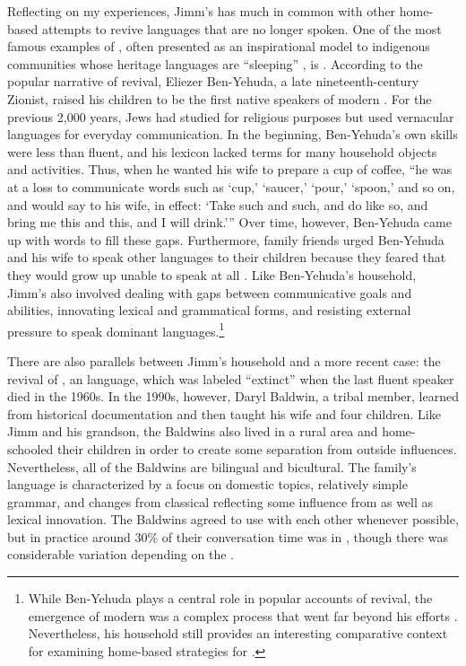 \documentclass[output=paper]{LSP/langsci}
\begin{document}
Reflecting on my experiences, Jimm's  has much in common with other home-based attempts to revive languages that are no longer spoken. One of the most famous examples of , often presented as an inspirational model to indigenous communities whose heritage languages are ``sleeping'' \citep[see][]{Hinton2008}, is . According to the popular narrative of  revival, Eliezer Ben-Yehuda, a late nineteenth-century Zionist, raised his children to be the first native speakers of modern . For the previous 2,000 years, Jews had studied  for religious purposes but used vernacular languages for everyday communication. In the beginning, Ben-Yehuda's own  skills were less than fluent, and his lexicon lacked terms for many household objects and activities. Thus, when he wanted his wife to prepare a cup of coffee, ``he was at a loss to communicate words such as `cup,' `saucer,' `pour,' `spoon,' and so on, and would say to his wife, in effect: `Take such and such, and do like so, and bring me this and this, and I will drink.'\thinspace'' \citep[37--38]{Fellman1973} Over time, however, Ben-Yehuda came up with words to fill these gaps. Furthermore, family friends urged Ben-Yehuda and his wife to speak other languages to their children because they feared that they would grow up unable to speak at all \citep[50--53]{BenAvi1984}. Like Ben-Yehuda's household, Jimm's  also involved dealing with gaps between communicative goals and abilities, innovating lexical and grammatical forms, and resisting external pressure to speak dominant languages.\footnote{While Ben-Yehuda plays a central role in popular accounts of  revival, the emergence of modern  was a complex process that went far beyond his efforts \citep{Harshav1999}. Nevertheless, his household still provides an interesting comparative context for examining home-based strategies for .}

There are also parallels between Jimm's household and a more recent case: the revival of , an  language, which was labeled ``extinct'' when the last fluent speaker died in the 1960s. In the 1990s, however, Daryl Baldwin, a tribal member, learned  from historical documentation and then taught his wife and four children. Like Jimm and his grandson, the Baldwins also lived in a rural area and home-schooled their children in order to create some separation from outside influences. Nevertheless, all of the Baldwins are bilingual and bicultural. The family's language is characterized by a focus on domestic topics, relatively simple grammar, and changes from classical  reflecting some influence from  as well as lexical innovation. The Baldwins agreed to use  with each other whenever possible, but in practice around 30\% of their conversation time was in , though there was considerable variation depending on the  \citep[14]{Leonard2007}.
\end{document}
